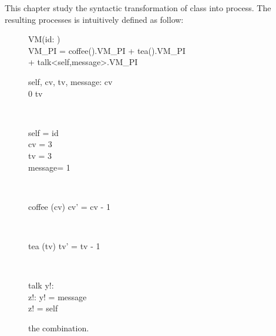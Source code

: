 This chapter study the syntactic transformation of \oz{} class into \picalc{} process. The resulting processes is intuitively defined as follow:\\

\begin{figure}[H]
\centering
\begin{class}{VM(id: \integer)}
\ 
\\VM\_PI = coffee().VM\_PI + tea().VM\_PI 
\\ \qquad \qquad \qquad + talk<self,message>.VM\_PI
\\
\begin{state}
self, cv, tv, message: \integer
{} \leq  cv 
\\
0 \leq  tv 
\end{state} 
\\
\begin{init}
self = id
\\cv = 3
\\tv = 3
\\ message= 1
\end{init} 
\\
\begin{op}{coffee}
\Delta (cv)
\ST
cv' = cv - 1
\end{op}
\\
\begin{op}{tea}
\Delta (tv)
\ST
tv' = tv - 1
\end{op}
\\
\begin{op}{talk}
y!: \integer
\\z!: \integer
\ST
y! = message
\\z! = self
\end{op}
\end{class}
\caption{the combination.}
\label{comp_oz_pi}
\end{figure}